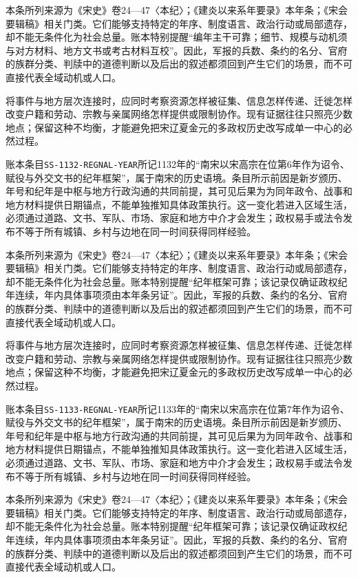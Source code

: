 本条所列来源为《宋史》卷24—47〈本纪〉；《建炎以来系年要录》本年条；《宋会要辑稿》相关门类。它们能够支持特定的年序、制度语言、政治行动或局部遗存，却不能无条件化为社会总量。账本特别提醒“编年主干可靠；细节、规模与动机须与对方材料、地方文书或考古材料互校”。因此，军报的兵数、条约的名分、官府的族群分类、判牍中的道德判断以及后出的叙述都须回到产生它们的场景，而不可直接代表全域动机或人口。

将事件与地方层次连接时，应同时考察资源怎样被征集、信息怎样传递、迁徙怎样改变户籍和劳动、宗教与亲属网络怎样提供或限制协作。现有证据往往只照亮少数地点；保留这种不均衡，才能避免把宋辽夏金元的多政权历史改写成单一中心的必然过程。

账本条目\texttt{SS-1132-REGNAL-YEAR}所记1132年的“南宋以宋高宗在位第6年作为诏令、赋役与外交文书的纪年框架”，属于南宋的历史语境。条目所示前因是新岁颁历、年号和纪年是中枢与地方行政沟通的共同前提，其可见后果为为同年政令、战事和地方材料提供日期锚点，不能单独推知具体政策执行。这一变化若进入区域生活，必须通过道路、文书、军队、市场、家庭和地方中介才会发生；政权易手或法令发布不等于所有城镇、乡村与边地在同一时间获得同样经验。

本条所列来源为《宋史》卷24—47〈本纪〉；《建炎以来系年要录》本年条；《宋会要辑稿》相关门类。它们能够支持特定的年序、制度语言、政治行动或局部遗存，却不能无条件化为社会总量。账本特别提醒“纪年框架可靠；该记录仅确证政权纪年连续，年内具体事项须由本年条另证”。因此，军报的兵数、条约的名分、官府的族群分类、判牍中的道德判断以及后出的叙述都须回到产生它们的场景，而不可直接代表全域动机或人口。

将事件与地方层次连接时，应同时考察资源怎样被征集、信息怎样传递、迁徙怎样改变户籍和劳动、宗教与亲属网络怎样提供或限制协作。现有证据往往只照亮少数地点；保留这种不均衡，才能避免把宋辽夏金元的多政权历史改写成单一中心的必然过程。

账本条目\texttt{SS-1133-REGNAL-YEAR}所记1133年的“南宋以宋高宗在位第7年作为诏令、赋役与外交文书的纪年框架”，属于南宋的历史语境。条目所示前因是新岁颁历、年号和纪年是中枢与地方行政沟通的共同前提，其可见后果为为同年政令、战事和地方材料提供日期锚点，不能单独推知具体政策执行。这一变化若进入区域生活，必须通过道路、文书、军队、市场、家庭和地方中介才会发生；政权易手或法令发布不等于所有城镇、乡村与边地在同一时间获得同样经验。

本条所列来源为《宋史》卷24—47〈本纪〉；《建炎以来系年要录》本年条；《宋会要辑稿》相关门类。它们能够支持特定的年序、制度语言、政治行动或局部遗存，却不能无条件化为社会总量。账本特别提醒“纪年框架可靠；该记录仅确证政权纪年连续，年内具体事项须由本年条另证”。因此，军报的兵数、条约的名分、官府的族群分类、判牍中的道德判断以及后出的叙述都须回到产生它们的场景，而不可直接代表全域动机或人口。

